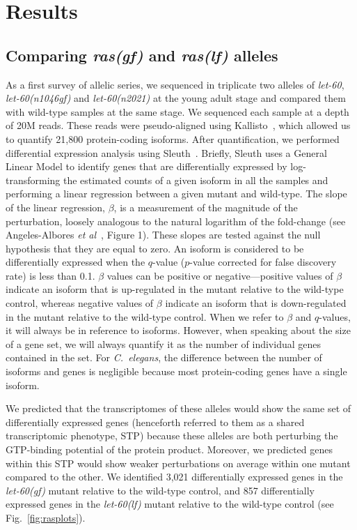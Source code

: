 \documentclass[10pt, onecolumn]{article}
\newcommand{\cel}{\emph{C.~elegans}}
\newcommand{\gene}[1]{\mbox{\emph{#1}}}
\newcommand{\letgfn}{3,021}
\newcommand{\letlfn}{857}
\newcommand{\letgf}{\gene{let-60(gf)}}
\newcommand{\letlf}{\gene{let-60(lf)}}
\begin{document}
\section*{Results}
\subsection*{Comparing \emph{ras(gf)} and \emph{ras(lf)} alleles}
As a first survey of allelic series, we sequenced in triplicate two alleles of
\gene{let-60}, \gene{let-60(n1046gf)} and \gene{let-60(n2021)} at the young
adult stage and compared them with wild-type samples at the same stage. We
sequenced each sample at a depth of 20M reads. These reads were pseudo-aligned
using Kallisto~\cite{}, which allowed us to quantify 21,800 protein-coding
isoforms. After quantification, we performed differential expression analysis
using Sleuth~\cite{}. Briefly, Sleuth uses a General Linear Model to identify
genes that are differentially expressed by log-transforming the estimated counts
of a given isoform in all the samples and performing a linear regression between
a given mutant and wild-type. The slope of the linear regression, $\beta$, is a
measurement of the magnitude of the perturbation, loosely analogous to the
natural logarithm of the fold-change (see Angeles-Albores \emph{et al}~\cite{},
Figure 1). These slopes are tested against the null hypothesis that they are
equal to zero. An isoform is considered to be differentially expressed when the
$q$-value ($p$-value corrected for false discovery rate) is less than 0.1.
$\beta$ values can be positive or negative---positive values of $\beta$ indicate
an isoform that is up-regulated in the mutant relative to the wild-type control,
whereas negative values of $\beta$ indicate an isoform that is down-regulated in
the mutant relative to the wild-type control. When we refer to $\beta$ and
$q$-values, it will always be in reference to isoforms. However, when speaking
about the size of a gene set, we will always quantify it as the number of
individual genes contained in the set. For \cel{}, the difference between the
number of isoforms and genes is negligible because most protein-coding genes
have a single isoform.


We predicted that the transcriptomes of these alleles
would show the same set of differentially expressed genes (henceforth referred
to them as a shared transcriptomic phenotype, STP) because these alleles are
both perturbing the GTP-binding potential of the protein product. Moreover, we
predicted genes within this STP would show weaker perturbations on average
within one mutant compared to the other.
We identified \letgfn{} differentially expressed genes in the \letgf{} mutant
relative to the wild-type control, and \letlfn{} differentially expressed genes
in the \letlf{} mutant relative to the wild-type control (see
Fig.~\ref{fig:rasplots}).
\end{document}

